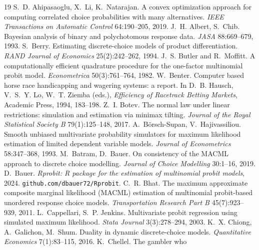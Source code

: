 \documentclass[11pt]{article}
\begin{document}
\begin{thebibliography}{19}\small
{} S.~D. Ahipasaoglu, X.~Li, K.~Natarajan. A
convex optimization approach for computing correlated choice
probabilities with many alternatives. \emph{IEEE Transactions on
Automatic Control} 64:190--205, 2019.
 J.~H. Albert, S.~Chib.
Bayesian analysis of binary and polychotomous response data.
\emph{JASA} 88:669--679, 1993.
 S.~Berry.
Estimating discrete-choice models of product differentiation.
\emph{RAND Journal of Economics} 25(2):242--262, 1994.
 J.~S. Butler and R.~Moffitt.
A computationally efficient quadrature procedure for the one-factor
multinomial probit model. \emph{Econometrica} 50(3):761--764, 1982.
 W.~Benter. Computer based horse
race handicapping and wagering systems: a report. In D.~B. Hausch,
V.~S.~Y. Lo, W.~T. Ziemba (eds.), \emph{Efficiency of Racetrack
Betting Markets}, Academic Press, 1994, 183--198.
 Z.~I. Botev.
The normal law under linear restrictions: simulation and estimation via minimax
tilting. \emph{Journal of the Royal Statistical Society B} 79(1):125--148, 2017.
A.~B\"orsch-Supan, V.~Hajivassiliou. Smooth unbiased multivariate probability
simulators for maximum likelihood estimation of limited dependent variable
models. \emph{Journal of Econometrics} 58:347--368, 1993.
 M.~Batram, D.~Bauer.
On consistency of the MACML approach to discrete choice modelling.
\emph{Journal of Choice Modelling} 30:1--16, 2019.
 D.~Bauer.
\emph{Rprobit: R package for the estimation of multinomial probit models},
2024. \texttt{github.com/dbauer72/Rprobit}.
 C.~R. Bhat.
The maximum approximate composite marginal likelihood (MACML) estimation of
multinomial probit-based unordered response choice models.
\emph{Transportation Research Part B} 45(7):923--939, 2011.
 L.~Cappellari,
S.~P. Jenkins. Multivariate probit regression using simulated maximum
likelihood. \emph{Stata Journal} 3(3):278--294, 2003.
 K.~X. Chiong, A.~Galichon, M.~Shum.
Duality in dynamic discrete-choice models.
\emph{Quantitative Economics} 7(1):83--115, 2016.
 K.~Chellel. The gambler who

\end{thebibliography}
\end{document}
